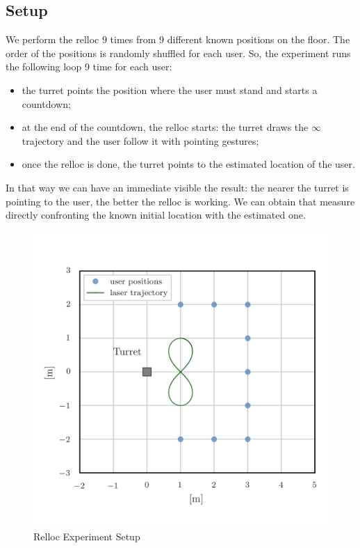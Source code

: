 \subsection{Setup}
We perform the relloc 9 times from 9 different known positions on the floor. The order of the positions is randomly shuffled for each user. So, the experiment runs the following loop 9 time for each user:
\begin{itemize}
    \item the turret points the position where the user must stand and starts a countdown;
    \item at the end of the countdown, the relloc starts: the turret draws the $\infty$ trajectory and the user follow it with pointing gestures;
    \item once the relloc is done, the turret points to the estimated location of the user.
\end{itemize}
In that way we can have an immediate visible the result: the nearer the turret is pointing to the user, the better the relloc is working. We can obtain that measure directly confronting the known initial location with the estimated one.
\begin{figure}
	\centering
	\includegraphics[width=\textwidth]{img/rellocExpSetup.png}%
	\caption{Relloc Experiment Setup}
	\label{fig:rellocExpSetup}
\end{figure}

